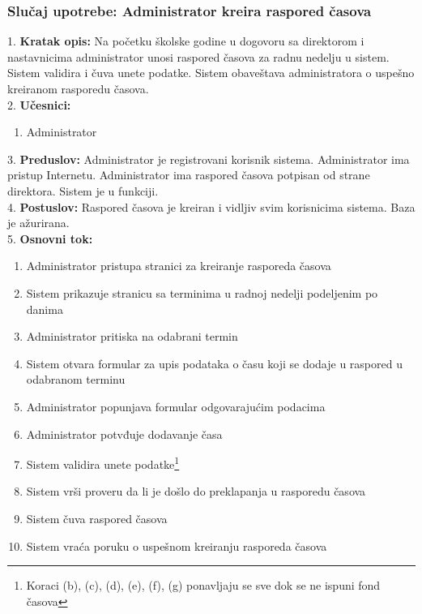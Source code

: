 \documentclass{article}
\begin{document}
\newpage
\subsubsection{Slučaj upotrebe: Administrator kreira raspored časova}
1. \textbf{Kratak opis:} Na početku školske godine u dogovoru sa direktorom i nastavnicima administrator unosi raspored časova za radnu nedelju u sistem. Sistem validira i čuva unete podatke. Sistem obaveštava administratora o uspešno kreiranom rasporedu časova. \\ 

2. \textbf{Učesnici:}
\begin{enumerate} [label=(\alph*)]
\item Administrator
\end{enumerate} 

3. \textbf{Preduslov:} Administrator je registrovani korisnik sistema. Administrator ima pristup Internetu. Administrator ima raspored časova potpisan od strane direktora. Sistem je u funkciji. \\

4. \textbf{Postuslov:} Raspored časova je kreiran i vidljiv svim korisnicima sistema. Baza je ažurirana. \\

5. \textbf{Osnovni tok:} 
\begin{enumerate} [label=(\alph*)]
\item Administrator pristupa stranici za kreiranje rasporeda časova
\item Sistem prikazuje stranicu sa terminima u radnoj nedelji podeljenim po danima
\item Administrator pritiska na odabrani termin
\item Sistem otvara formular za upis podataka o času koji se dodaje u raspored u odabranom terminu
\item Administrator popunjava formular odgovarajućim podacima
\item Administrator potvđuje dodavanje časa 
\item Sistem validira unete podatke\footnote{Koraci (b), (c), (d), (e), (f), (g) ponavljaju se sve dok se ne ispuni fond časova}
\item Sistem vrši proveru da li je došlo do preklapanja u rasporedu časova
\item Sistem čuva raspored časova
\item Sistem vraća poruku o uspešnom kreiranju rasporeda časova
\end{enumerate}
\end{document}
